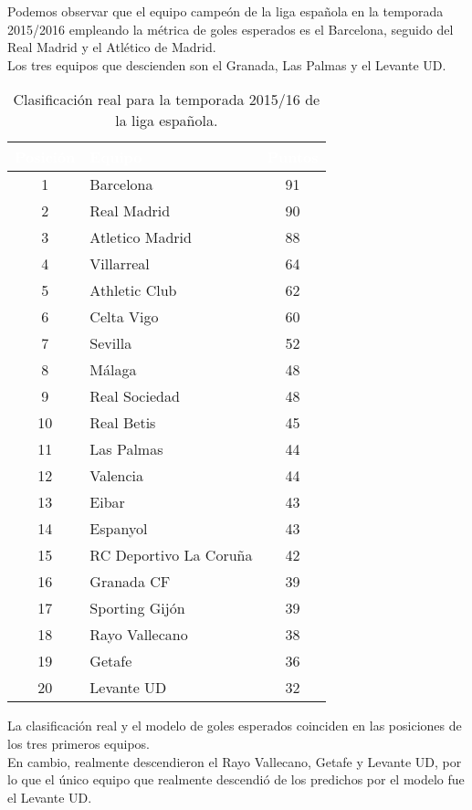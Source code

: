 Podemos observar que el equipo campeón de la liga española en la temporada 2015/2016 empleando la métrica de goles esperados es el Barcelona, seguido del Real Madrid y el Atlético de Madrid. \\
Los tres equipos que descienden son el Granada, Las Palmas y el Levante UD.

\begin{table}[H]
\centering
\begin{tabular}{|c|l|c|}
\hline
\rowcolor{black} 
\textcolor{white}{\textbf{Posición}} & \textcolor{white}{\textbf{Equipo}} & \textcolor{white}{\textbf{Puntos}} \\ 
\hline
\cellcolor{yellow} 1  & \cellcolor{yellow} Barcelona        & \cellcolor{yellow} 91 \\ 
\hline
\cellcolor{gray} 2  & \cellcolor{gray} Real Madrid         & \cellcolor{gray} 90 \\ 
\hline
\cellcolor{brown} 3  & \cellcolor{brown} Atletico Madrid    & \cellcolor{brown} 88 \\ 
\hline
4  & Villarreal             & 64 \\ 
\hline
5  & Athletic Club          & 62 \\ 
\hline
6  & Celta Vigo             & 60 \\ 
\hline
7  & Sevilla                & 52 \\ 
\hline
8  & Málaga                 & 48 \\ 
\hline
9  & Real Sociedad          & 48 \\ 
\hline
10 & Real Betis             & 45 \\ 
\hline
11 & Las Palmas             & 44 \\ 
\hline
12 & Valencia               & 44 \\ 
\hline
13 & Eibar                  & 43 \\ 
\hline
14 & Espanyol               & 43 \\ 
\hline
15 & RC Deportivo La Coruña    & 42 \\ 
\hline
16 & Granada CF             & 39 \\ 
\hline
17 & Sporting Gijón         & 39 \\ 
\hline
\cellcolor{red} 18 & \cellcolor{red} Rayo Vallecano        & \cellcolor{red} 38 \\ 
\hline
\cellcolor{red} 19 & \cellcolor{red} Getafe                & \cellcolor{red} 36 \\ 
\hline
\cellcolor{red} 20 & \cellcolor{red} Levante UD               & \cellcolor{red} 32 \\ 
\hline
\end{tabular}
\caption{Clasificación real para la temporada 2015/16 de la liga española.}
\label{table:clasificacionReal}
\end{table}
La clasificación real y el modelo de goles esperados coinciden en las posiciones de los tres primeros equipos. \\
En cambio, realmente descendieron el Rayo Vallecano, Getafe y Levante UD, por lo que el único equipo que realmente descendió de los predichos por el modelo fue el Levante UD.

